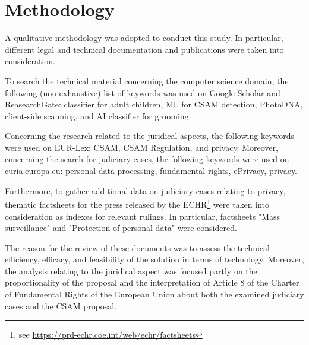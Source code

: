 \section{Methodology}
\label{s:meth}

A qualitative methodology was adopted to conduct this study. In particular, different legal and technical documentation and publications were taken into consideration.

To search the technical material concerning the computer science domain, the following (non-exhaustive) list of keywords was used on Google Scholar and ReasearchGate: classifier for adult children, ML for CSAM detection, PhotoDNA, client-side scanning, and AI classifier for grooming.

Concerning the research related to the juridical aspects, the following keywords were used on EUR-Lex: CSAM, CSAM Regulation, and privacy. Moreover, concerning the search for judiciary cases, the following keywords were used on curia.europa.eu: personal data processing, fundamental rights, ePrivacy, privacy.

Furthermore, to gather additional data on judiciary cases relating to privacy, thematic factsheets for the press released by the ECHR\footnote{see \url{https://prd-echr.coe.int/web/echr/factsheets}} were taken into consideration as indexes for relevant rulings. In particular, factsheets "Mass surveillance" and "Protection of personal data" were considered.

The reason for the review of these documents was to assess the technical efficiency, efficacy, and feasibility of the solution in terms of technology. Moreover, the analysis relating to the juridical aspect was focused partly on the proportionality of the proposal and the interpretation of Article 8 of the Charter of Fundamental Rights of the European Union about both the examined judiciary cases and the CSAM proposal.
